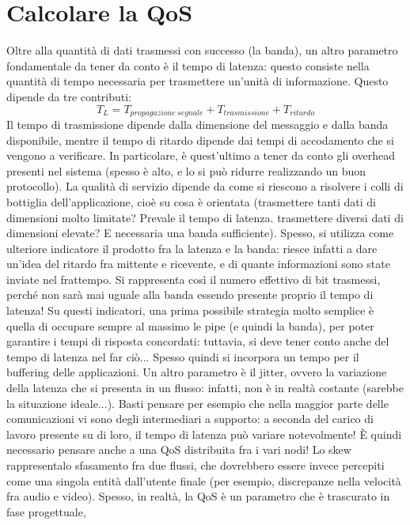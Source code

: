 \section{Calcolare la QoS}
Oltre alla quantità di dati trasmessi con successo (la banda), un altro
parametro fondamentale da tener da conto è il
tempo di latenza: questo consiste nella quantità di tempo necessaria per
trasmettere un'unità di informazione. Questo
dipende da tre contributi:
\begin{equation}
T_L = T_{propagazione\:segnale} + T_{trasmissione} + T_{ritardo}
\end{equation}
Il tempo di trasmissione dipende dalla dimensione del messaggio e dalla banda
disponibile, mentre il tempo di ritardo
dipende dai tempi di accodamento che si vengono a verificare. In particolare, è
quest'ultimo a tener da conto gli
overhead presenti nel sistema (spesso è alto, e lo si può ridurre realizzando un
buon protocollo).
La qualità di servizio dipende da come si riescono a risolvere i colli di
bottiglia dell'applicazione, cioè su cosa è
orientata (trasmettere tanti dati di dimensioni molto limitate? Prevale il tempo
di latenza. trasmettere diversi dati
di dimensioni elevate? E necessaria una banda sufficiente). Spesso, si utilizza
come ulteriore indicatore il prodotto
fra la latenza e la banda: riesce infatti a dare un'idea del ritardo fra
mittente e ricevente, e di quante informazioni
sono state inviate nel frattempo. Si rappresenta così il numero effettivo di bit
trasmessi, perché non sarà mai uguale
alla banda essendo presente proprio il tempo di latenza! Su questi indicatori,
una prima possibile strategia molto
semplice è quella di occupare sempre al massimo le pipe (e quindi la banda), per
poter garantire i tempi di risposta
concordati: tuttavia, si deve tener conto anche del tempo di latenza nel far
ciò... Spesso quindi si incorpora un
tempo per il buffering delle applicazioni. Un altro parametro è il jitter,
ovvero la variazione della latenza che si
presenta in un flusso: infatti, non è in realtà costante (sarebbe la situazione
ideale...).
Basti pensare per esempio che nella maggior parte delle comunicazioni vi sono
degli intermediari a supporto: a seconda
del carico di lavoro presente su di loro, il tempo di latenza può variare
notevolmente! È quindi necessario pensare
anche a una QoS distribuita fra i vari nodi!
Lo skew rappresentalo sfasamento fra due flussi, che dovrebbero essere invece
percepiti come una singola entità
dall'utente finale (per esempio, discrepanze nella velocità fra audio e video).
Spesso, in realtà, la QoS è un parametro che è trascurato in fase progettuale,
